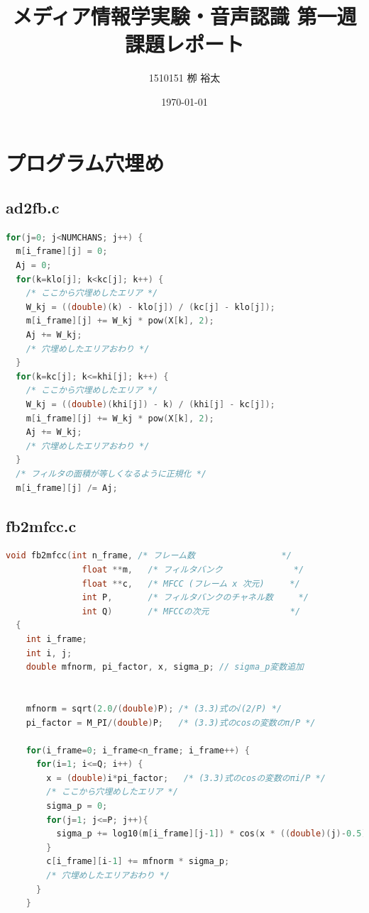 \documentclass[11pt,a4paper, uplatex]{jsarticle}
\title{メディア情報学実験・音声認識 第一週課題レポート}
\author{1510151  栁 裕太}
\date{\today}
\begin{document}
\maketitle
\section{プログラム穴埋め}

\subsection{ad2fb.c}

\begin{lstlisting}[language=c, caption=\texttt{ad2fb}関数一部]
  for(j=0; j<NUMCHANS; j++) {
  m[i_frame][j] = 0;
  Aj = 0;
  for(k=klo[j]; k<kc[j]; k++) {
    /* ここから穴埋めしたエリア */
    W_kj = ((double)(k) - klo[j]) / (kc[j] - klo[j]);
    m[i_frame][j] += W_kj * pow(X[k], 2);
    Aj += W_kj;
    /* 穴埋めしたエリアおわり */
  }
  for(k=kc[j]; k<=khi[j]; k++) {
    /* ここから穴埋めしたエリア */
    W_kj = ((double)(khi[j]) - k) / (khi[j] - kc[j]);
    m[i_frame][j] += W_kj * pow(X[k], 2);
    Aj += W_kj;
    /* 穴埋めしたエリアおわり */
  }
  /* フィルタの面積が等しくなるように正規化 */
  m[i_frame][j] /= Aj;
\end{lstlisting}

\subsection{fb2mfcc.c}

\begin{lstlisting}[language=c, breaklines = true, caption=\texttt{fb2mfcc}関数一部]
  void fb2mfcc(int n_frame, /* フレーム数                 */
               float **m,   /* フィルタバンク              */
               float **c,   /* MFCC (フレーム x 次元)     */
               int P,       /* フィルタバンクのチャネル数     */
               int Q)       /* MFCCの次元                */
  {
    int i_frame;
    int i, j;
    double mfnorm, pi_factor, x, sigma_p; // sigma_p変数追加


    mfnorm = sqrt(2.0/(double)P); /* (3.3)式の√(2/P) */
    pi_factor = M_PI/(double)P;   /* (3.3)式のcosの変数のπ/P */

    for(i_frame=0; i_frame<n_frame; i_frame++) {
      for(i=1; i<=Q; i++) {
        x = (double)i*pi_factor;   /* (3.3)式のcosの変数のπi/P */
        /* ここから穴埋めしたエリア */
        sigma_p = 0;
        for(j=1; j<=P; j++){
          sigma_p += log10(m[i_frame][j-1]) * cos(x * ((double)(j)-0.5));
        }
        c[i_frame][i-1] += mfnorm * sigma_p;
        /* 穴埋めしたエリアおわり */
      }
    }
\end{lstlisting}
\end{document}
